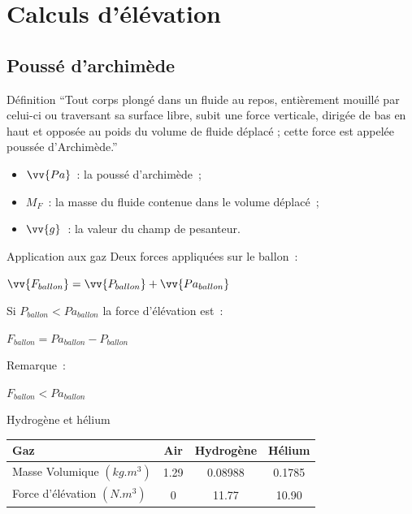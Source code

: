 

\section{Calculs d'élévation}

\subsection{Poussé d'archimède}

\begin{frame}{Définition}
  \enquote{Tout corps plongé dans un fluide au repos, entièrement mouillé par celui-ci ou traversant sa surface libre, subit une force verticale, dirigée de bas en haut et opposée au poids du volume de fluide déplacé ; cette force est appelée poussée d'Archimède.}
  \bigbreak
  \begin{center}
  \end{center}
  \begin{itemize}
    \item $\vv{Pa}$~: la poussé d'archimède~;
    \item $M_F$~: la masse du fluide contenue dans le volume déplacé~;
    \item $\vv{g}$~: la valeur du champ de pesanteur.
  \end{itemize}
\end{frame}

\begin{frame}{Application aux gaz}
  Deux forces appliquées sur le ballon~: \\
  \begin{center}
    $\displaystyle{\vv{F_{ballon}} = \vv{P_{ballon}} + \vv{Pa_{ballon}}}$ \\
  \end{center}
  Si $P_{ballon} < Pa_{ballon}$ la force d'élévation est~:
  \begin{center}
    $\displaystyle{F_{ballon} = Pa_{ballon} - P_{ballon}}$ \\
  \end{center}
  Remarque~:\\
  \begin{center}
    $F_{ballon} < Pa_{ballon}$
  \end{center}
\end{frame}

\begin{frame}{Hydrogène et hélium}
	\begin{center}
		\begin{tabular}{|l|c|c|c|}
			\hline
			Gaz & Air & Hydrogène & Hélium \\
			\hline
			Masse Volumique $(kg.m^3)$ & 1.29 & 0.08988 & 0.1785 \\
			\hline
			Force d'élévation $(N.m^3)$ & 0 & 11.77 & 10.90 \\
			\hline
		\end{tabular}
	\end{center}
\end{frame}


